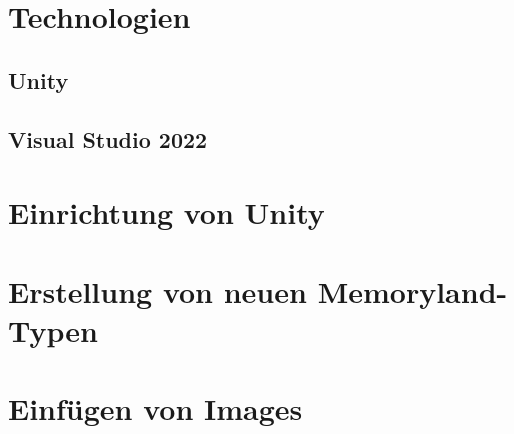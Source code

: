 
\section{Technologien}

\subsection{Unity}

\subsection{Visual Studio 2022}


\section{Einrichtung von Unity}


\section{Erstellung von neuen Memoryland-Typen}

\section{Einfügen von Images}
